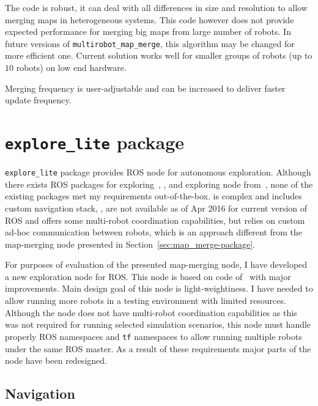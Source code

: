 The code is robust, it can deal with all differences in size and resolution to allow merging maps in heterogeneous systems. This code however does not provide expected performance for merging big maps from large number of robots. In future versions of \texttt{multi\-rob\-ot\_map\_merge}, this algorithm may be changed for more efficient one.
Current solution works well for smaller groups of robots (up to $10$ robots) on low end hardware.

Merging frequency is user-adjustable and can be increased to deliver faster update frequency.

\section{\texttt{explore\_lite} package} %
\label{sec:explore_lite-package}

\texttt{explore\_lite} package provides \gls{ROS} node for autonomous exploration. Although there exists \gls{ROS} packages for exploring~\cite{2013:RoboCup}, \cite{DuHadway2010}, \cite{Bovbel2010} and exploring node from~\cite{Andre2014}, none of the existing packages met my requirements out-of-the-box. \cite{2013:RoboCup} is complex and includes custom navigation stack, \cite{DuHadway2010}, \cite{Bovbel2010} are not available as of Apr 2016 for current version of \gls{ROS} and \cite{Andre2014} offers some multi-robot coordination capabilities, but relies on custom ad-hoc communication between robots, which is an approach different from the map-merging node presented in Section~\ref{sec:map_merge-package}.

For purposes of evaluation of the presented map-merging node, I have developed a new exploration node for \gls{ROS}. This node is based on code of~\cite{DuHadway2010} with major improvements. Main design goal of this node is light-weightiness. I have needed to allow running more robots in a testing environment with limited resources. Although the node does not have multi-robot coordination capabilities as this was not required for running selected simulation scenarios, this node must handle properly \gls{ROS} namespaces and \texttt{tf} namespaces to allow running multiple robots under the same \gls{ROS} master. As a result of these requirements major parts of the node have been redesigned.

\subsection{Navigation}

